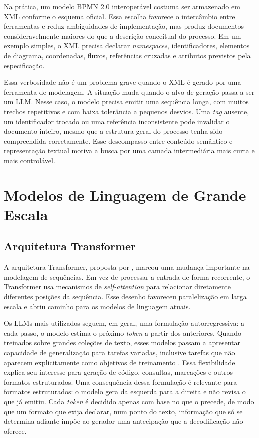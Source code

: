 Na prática, um modelo BPMN 2.0 interoperável costuma ser armazenado em XML conforme o esquema oficial. Essa escolha favorece o intercâmbio entre ferramentas e reduz ambiguidades de implementação, mas produz documentos consideravelmente maiores do que a descrição conceitual do processo. Em um exemplo simples, o XML precisa declarar \textit{namespaces}, identificadores, elementos de diagrama, coordenadas, fluxos, referências cruzadas e atributos previstos pela especificação.

Essa verbosidade não é um problema grave quando o XML é gerado por uma ferramenta de modelagem. A situação muda quando o alvo de geração passa a ser um LLM. Nesse caso, o modelo precisa emitir uma sequência longa, com muitos trechos repetitivos e com baixa tolerância a pequenos desvios. Uma \textit{tag} ausente, um identificador trocado ou uma referência inconsistente pode invalidar o documento inteiro, mesmo que a estrutura geral do processo tenha sido compreendida corretamente. Esse descompasso entre conteúdo semântico e representação textual motiva a busca por uma camada intermediária mais curta e mais controlável.

\section{Modelos de Linguagem de Grande Escala}
\label{sec:llms}

\subsection{Arquitetura Transformer}
\label{subsec:transformer}

A arquitetura Transformer, proposta por , marcou uma mudança importante na modelagem de sequências. Em vez de processar a entrada de forma recorrente, o Transformer usa mecanismos de \textit{self-attention} para relacionar diretamente diferentes posições da sequência. Esse desenho favoreceu paralelização em larga escala e abriu caminho para os modelos de linguagem atuais.

Os LLMs mais utilizados seguem, em geral, uma formulação autorregressiva: a cada passo, o modelo estima o próximo \textit{token} a partir dos anteriores. Quando treinados sobre grandes coleções de texto, esses modelos passam a apresentar capacidade de generalização para tarefas variadas, inclusive tarefas que não aparecem explicitamente como objetivos de treinamento \cite{brown2020language}. Essa flexibilidade explica seu interesse para geração de código, consultas, marcações e outros formatos estruturados. Uma consequência dessa formulação é relevante para formatos estruturados: o modelo gera da esquerda para a direita e não revisa o que já emitiu. Cada \textit{token} é decidido apenas com base no que o precede, de modo que um formato que exija declarar, num ponto do texto, informação que só se determina adiante impõe ao gerador uma antecipação que a decodificação não oferece.

